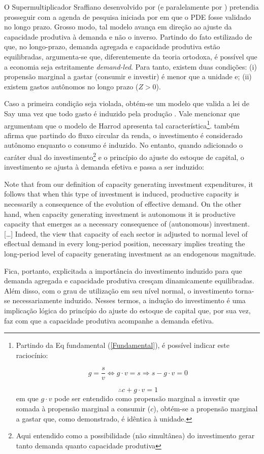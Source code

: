 O Supermultiplicador Sraffiano desenvolvido por \textcite{serrano_sraffian_1995} (e paralelamente por \textcite{bortis_institutions_1996}) pretendia prosseguir com a agenda de pesquisa iniciada por \textcite[Original de 1962]{garegnani_problem_2015} em que o PDE fosse validado no longo prazo.  Grosso modo, tal modelo avança em direção ao ajuste da capacidade produtiva à demanda e não o inverso.
Partindo do fato estilizado de que, no longo-prazo, demanda agregada e capacidade produtiva estão equilibradas, argumenta-se que, diferentemente da teoria ortodoxa, é possível que a economia seja estritamente \textit{demand-led}. Para tanto, existem duas condições: (i) propensão marginal a gastar (consumir e investir) é menor que a unidade e; (ii) existem gastos autônomos no longo prazo ($Z > 0$).

Caso a primeira condição seja violada, obtém-se um modelo que valida a lei de Say uma vez que todo gasto é induzido pela produção \cite[p.~ 75]{serrano_sraffian_1995}. Vale mencionar que \textcite{serrano_trouble_2017} argumentam que o modelo de Harrod apresenta tal característica\footnote{Partindo da Eq fundamental (\ref{Fundamental}), é possível indicar este raciocínio:

$$
g = \frac{s}{v} \Leftrightarrow g\cdot v = s \Rightarrow s - g\cdot v = 0
$$

$$
\therefore c + g\cdot v = 1
$$
em que $g\cdot v$ pode ser entendido como propensão marginal a investir que somada à propensão marginal a consumir ($c$), obtém-se a propensão marginal a gastar que, como demonstrado, é idêntica à unidade.}. \textcite{serrano_long_1995} também afirma que partindo do fluxo circular da renda, o investimento é considerado autônomo enquanto o consumo é induzido. No entanto, quando adicionado o caráter dual do investimento\footnote{Aqui entendido  como a possibilidade (não simultânea) do investimento gerar tanto demanda quanto capacidade produtiva} e o princípio do ajuste do estoque de capital, o investimento se ajusta à demanda efetiva e passa a ser induzido:

\begin{citacao}
Note that from our definition of capacity generating investment expenditures, it follows that when this type of investment is induced, productive capacity is necessarily a consequence of the evolution of effective demand. On the other hand, when capacity generating investment is autonomous it is productive capacity that emerges as a necessary consequence of (autonomous) investment. […] Indeed, the view that capacity of each sector is adjusted to normal level of eflectual demand in every long-period position, necessary implies treating the long-period level of capacity generating investment as an endogenous magnitude. \cite[p.~77]{serrano_sraffian_1995}
\end{citacao}
Fica, portanto, explicitada a importância do investimento induzido para que demanda agregada e capacidade produtiva cresçam dinamicamente equilibradas. Além disso, com o grau de utilização em seu nível normal, o investimento torna-se necessariamente induzido. Nesses termos, a indução do investimento é uma implicação lógica do princípio do ajuste do estoque de capital que, por sua vez, faz com que a capacidade produtiva acompanhe a demanda efetiva.

